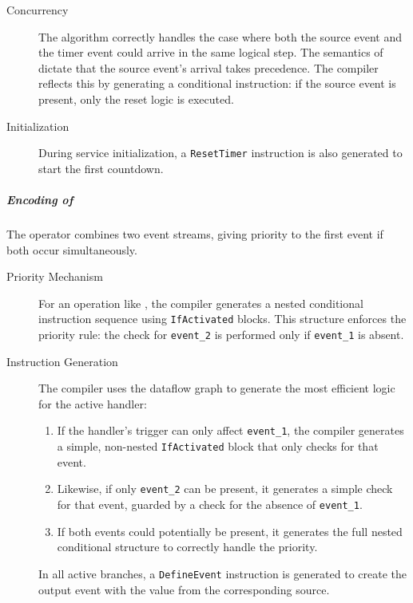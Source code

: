\begin{enumerate}
\begin{description}
              \item[Concurrency]
                    The algorithm correctly handles the case where both the source event and the
                    timer event could arrive in the same logical step. The semantics of
                     dictate that the source event's arrival takes precedence. The
                    compiler reflects this by generating a conditional instruction: if the source
                    event is present, only the reset logic is executed.

              \item[Initialization]
                    During service initialization, a \texttt{ResetTimer} instruction is also
                    generated to start the first countdown.
          \end{description}

          \subparagraph{Encoding of }
          The  operator combines two event streams, giving priority to the first
          event if both occur simultaneously.
          \begin{description}
              \item[Priority Mechanism]
                    For an operation like , the compiler generates
                    a nested conditional instruction sequence using \texttt{IfActivated} blocks.
                    This structure enforces the priority rule: the check for \texttt{event\_2} is
                    performed only if \texttt{event\_1} is absent.

              \item[Instruction Generation]
                    The compiler uses the dataflow graph to generate the most efficient logic for
                    the active handler:
                    \begin{enumerate}
                        \item If the handler's trigger can only affect \texttt{event\_1}, the compiler
                              generates a simple, non-nested \texttt{IfActivated} block that only
                              checks for that event.
                        \item Likewise, if only \texttt{event\_2} can be present, it generates a
                              simple check for that event, guarded by a check for the absence of
                              \texttt{event\_1}.
                        \item If both events could potentially be present, it generates the full
                              nested conditional structure to correctly handle the priority.
                    \end{enumerate}
                    In all active branches, a \texttt{DefineEvent} instruction is generated to
                    create the output event with the value from the corresponding source.


\end{description}
\end{enumerate}
